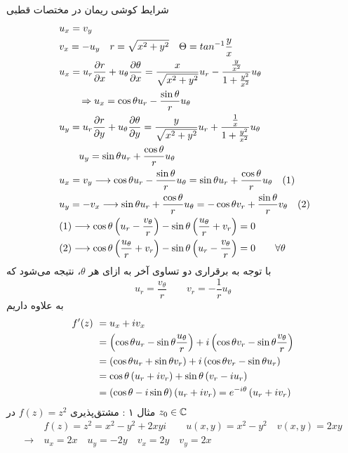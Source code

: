 شرایط کوشی ریمان در مختصات قطبی
\[\begin{aligned}
	&\
	u_x=v_y
	\\ &\
	v_x=-u_y \quad r=\sqrt{x^2+y^2}\quad \Theta=tan^{-1}\frac yx
	\\ &\
	u_x=u_r\frac{\partial r}{\partial x}+u_{\theta}\frac{\partial \theta}{\partial x}=\frac{x}{\sqrt{x^2+y^2}}u_r-\frac{\frac y{x^2}}{1+\frac{y^2}{x^2}}u_{\theta}
	\\ &\
	\qquad \Rightarrow u_x=\cos\theta u_r-\frac{\sin\theta}{r}u_\theta
	\\ &\
	u_y=u_r\frac{\partial r}{\partial y}+u_\theta\frac{\partial\theta}{\partial y}=\frac{y}{\sqrt{x^2+y^2}}u_r+\frac{\frac1x}{1+\frac{y^2}{x^2}}u_\theta
	\\ &\
	\qquad u_y=\sin\theta u_r+\frac{\cos\theta}{r}u_\theta
	\\ &\
	u_x=v_y\longrightarrow
	\cos\theta u_r-\frac{\sin\theta}{r}u_\theta=
	\sin\theta u_r+\frac{\cos\theta}{r}u_\theta\quad (1)
	\\ &\
	u_y=-v_x\longrightarrow \sin\theta u_r+\frac{\cos\theta}{r}u_\theta=-\cos\theta v_r+\frac{\sin\theta}{r}v_\theta\quad(2)
	\\ &\
	(1)\longrightarrow \cos\theta\left(u_r-\frac{v_\theta}{r}\right)-\sin\theta\left(\frac{u_\theta}{r}+v_r\right)=0
	\\ &\
	(2)\longrightarrow \cos\theta\left(\frac{u_\theta}{r}+v_r\right)-\sin\theta\left(u_r-\frac{v_\theta}{r}\right)=0 \qquad \forall \theta
\end{aligned}\]
با توجه به برقراری دو تساوی آخر به ازای هر
$\theta$،
نتیجه می‌شود که
\[
u_r=\frac{v_\theta}{r} \qquad v_r=-\frac1r u_\theta
\]
به علاوه داریم
\[\begin{aligned}
	f^\prime(z)&\ =u_x+iv_x
	\\ &\
	=\left(\cos\theta u_r-\sin\theta\frac{u_\theta}{r}\right)+i\left(\cos\theta v_r-\sin\theta\frac{v_\theta}{r}\right)
	\\ &\
	=\left(\cos\theta u_r+\sin\theta v_r\right)+i\left(\cos\theta v_r-\sin\theta u_r\right)
	\\ &\
	=\cos\theta\left(u_r+iv_r\right)+\sin\theta\left(v_r-i u_r\right)
	\\ &\
	=\left(\cos\theta-i\sin\theta\right)\left(u_r+iv_r\right)=e^{-i\theta}\left(u_r+iv_r\right)
\end{aligned}\]
مثال ۱ : مشتق‌پذیری
$f(z)=z^2$
در
$z_0\in\mathbb{C}$
\[\begin{aligned}
	&\
	f(z)=z^2=x^2-y^2+2xyi \qquad u(x,y)=x^2-y^2\quad v(x,y)=2xy
	\\ \longrightarrow&\
	u_x=2x\quad u_y=-2y \quad v_x=2y \quad v_y=2x
\end{aligned}\]
